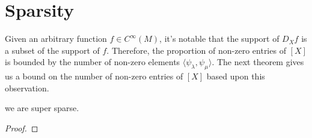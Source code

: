 \section{Sparsity}
  Given an arbitrary function $f \in C^{\infty}(M)$, it's notable that the support of $D_X f$ is a subset of the support of $f$.
  Therefore, the proportion of non-zero entries of $[X]$ is bounded by the number of non-zero elements $\langle \psi_\lambda , \psi_\mu \rangle$.
  The next theorem gives us a bound on the number of non-zero entries of $[X]$ based upon this observation.
  
  \begin{theorem}
  we are super sparse.
  \end{theorem}
  \begin{proof}
  
  \end{proof}